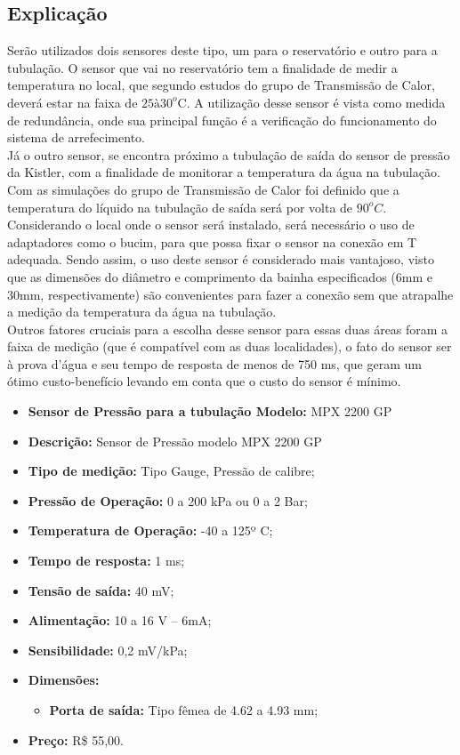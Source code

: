 \subsection{Explicação}
Serão utilizados dois sensores deste tipo, um para o reservatório e outro para a tubulação. O sensor que vai no reservatório tem a finalidade de medir a temperatura no local, que segundo estudos do grupo de Transmissão de Calor, deverá estar na faixa de $25 à 30^o$C. A utilização desse sensor é vista como medida de redundância, onde sua principal função é a verificação do funcionamento do sistema de arrefecimento. \\
Já o outro sensor, se encontra próximo a tubulação de saída do sensor de pressão da Kistler, com a finalidade de monitorar a temperatura da água na tubulação. Com as simulações do grupo de Transmissão de Calor foi definido que a temperatura do líquido na tubulação de saída será por volta de $90^oC$. Considerando o local onde o sensor será instalado, será necessário o uso de adaptadores como o bucim, para que possa fixar o sensor na conexão em T adequada. Sendo assim, o uso deste sensor é considerado mais vantajoso, visto que as dimensões do diâmetro e comprimento da bainha especificados (6mm e 30mm, respectivamente) são convenientes para fazer a conexão sem que atrapalhe a medição da temperatura da água na tubulação.\\
Outros fatores cruciais para a escolha desse sensor para essas duas áreas foram a faixa de medição (que é compatível com as duas localidades), o fato do sensor ser à prova d’água e seu tempo de resposta de menos de 750 ms, que geram um ótimo custo-benefício levando em conta que o custo do sensor é mínimo.
\begin{itemize}
	\item \textbf{Sensor de Pressão para a tubulação
	Modelo:} MPX 2200 GP
	\item \textbf{Descrição:} Sensor de Pressão modelo MPX 2200 GP 
	\item \textbf{Tipo de medição:} Tipo Gauge, Pressão de calibre;
	\item \textbf{Pressão de Operação:} 0 a 200 kPa ou 0 a 2 Bar;
	\item \textbf{Temperatura de Operação:} -40 a 125º C;
	\item \textbf{Tempo de resposta:} 1 ms;
	\item \textbf{Tensão de saída:} 40 mV;
	\item \textbf {Alimentação:} 10 a 16 V – 6mA;
	\item \textbf{Sensibilidade:} 0,2 mV/kPa;
	\item \textbf{Dimensões:}
	\begin{itemize}
		\item \textbf{Porta de saída:} Tipo fêmea de 4.62 a 4.93 mm;
	\end{itemize}
	
	\item \textbf{Preço:} R\$ 55,00.
	
\end{itemize}
